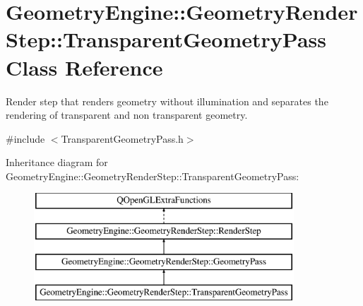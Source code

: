 \hypertarget{class_geometry_engine_1_1_geometry_render_step_1_1_transparent_geometry_pass}{}\section{Geometry\+Engine\+::Geometry\+Render\+Step\+::Transparent\+Geometry\+Pass Class Reference}
\label{class_geometry_engine_1_1_geometry_render_step_1_1_transparent_geometry_pass}


Render step that renders geometry without illumination and separates the rendering of transparent and non transparent geometry.  




{\ttfamily \#include $<$Transparent\+Geometry\+Pass.\+h$>$}

Inheritance diagram for Geometry\+Engine\+::Geometry\+Render\+Step\+::Transparent\+Geometry\+Pass\+:\begin{figure}[H]
\begin{center}
\leavevmode
\includegraphics[height=4.000000cm]{class_geometry_engine_1_1_geometry_render_step_1_1_transparent_geometry_pass}
\end{center}
\end{figure}
